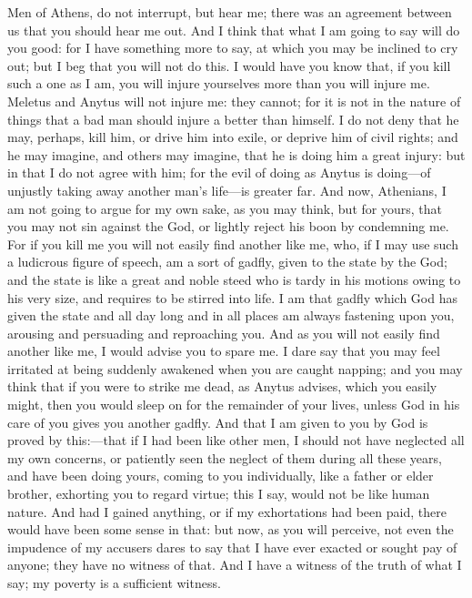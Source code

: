 \documentclass[12pt]{article}
\begin{document}
Men of Athens, do not interrupt, but hear me; there was an agreement
between us that you should hear me out. And I think that what I am
going to say will do you good: for I have something more to say, at
which you may be inclined to cry out; but I beg that you will not
do this. I would have you know that, if you kill such a one as I am,
you will injure yourselves more than you will injure me. Meletus and
Anytus will not injure me: they cannot; for it is not in the nature
of things that a bad man should injure a better than himself. I do
not deny that he may, perhaps, kill him, or drive him into exile,
or deprive him of civil rights; and he may imagine, and others may
imagine, that he is doing him a great injury: but in that I do not
agree with him; for the evil of doing as Anytus is doing---of unjustly
taking away another man's life---is greater far. And now, Athenians,
I am not going to argue for my own sake, as you may think, but for
yours, that you may not sin against the God, or lightly reject his
boon by condemning me. For if you kill me you will not easily find
another like me, who, if I may use such a ludicrous figure of speech,
am a sort of gadfly, given to the state by the God; and the state
is like a great and noble steed who is tardy in his motions owing
to his very size, and requires to be stirred into life. I am that
gadfly which God has given the state and all day long and in all places
am always fastening upon you, arousing and persuading and reproaching
you. And as you will not easily find another like me, I would advise
you to spare me. I dare say that you may feel irritated at being suddenly
awakened when you are caught napping; and you may think that if you
were to strike me dead, as Anytus advises, which you easily might,
then you would sleep on for the remainder of your lives, unless God
in his care of you gives you another gadfly. And that I am given to
you by God is proved by this:---that if I had been like other men,
I should not have neglected all my own concerns, or patiently seen
the neglect of them during all these years, and have been doing yours,
coming to you individually, like a father or elder brother, exhorting
you to regard virtue; this I say, would not be like human nature.
And had I gained anything, or if my exhortations had been paid, there
would have been some sense in that: but now, as you will perceive,
not even the impudence of my accusers dares to say that I have ever
exacted or sought pay of anyone; they have no witness of that. And
I have a witness of the truth of what I say; my poverty is a sufficient
witness.
\end{document}
